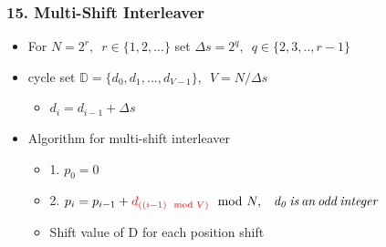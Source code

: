 \documentclass{beamer}  %
\begin{document}
\begin{frame}
\frametitle{15. Multi-Shift Interleaver}

\begin{itemize}
\setlength\itemsep{1.5em}



\item For $N=2^r,\,\,\, r\in \{ 1,2,...\}$ set $\Delta s= 2^q, \,\,\, q\in\{2,3,..,r-1\}$

\item cycle set $\mathbb{D}=\{d_0,d_1,...,d_{V-1}\},\,\,\, V=N/\Delta s$
\begin{itemize}
\item $d_i=d_{i-1}+\Delta s$
\end{itemize}

\item Algorithm for multi-shift interleaver

\begin{itemize}
\item 1. $p_0=0$
 
 \item 2. $p_i=p_{i-1}+\textcolor{red}{d_{((i-1) \mod V) } }\mod N,\,\,\,\,\,  \mathit{d_0 \,is \,an \,odd \,integer}$

\item Shift value of D for each position shift
\end{itemize}






\end{itemize}


\end{frame}
\end{document}
